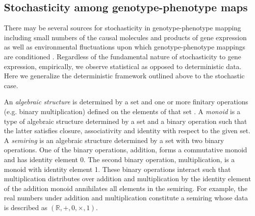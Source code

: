 \subsection{Stochasticity among genotype-phenotype maps}
There may be several sources for stochasticity in genotype-phenotype mapping including small numbers of the causal molecules and products of gene expression as well as environmental fluctuations upon which genotype-phenotype mappings are conditioned \cite{Swain2002,Paulsson2004,Thattai2004,Acar2008a,Lestas2010,Munsky2012,Chalancon2012,Neuert2013,Sanchez2013}. Regardless of the fundamental nature of stochasticity to gene expression, empirically, we observe statistical as opposed to deterministic data. Here we generalize the deterministic framework outlined above to the stochastic case.

An \emph{algebraic structure} is determined by a set and one or more finitary operations (e.g. binary multiplication) defined on the elements of that set \cite{PachterLior2005,Artin2010}. A \emph{monoid} is a type of algebraic structure determined by a set and a binary operation such that the latter satisfies closure, associativity and identity with respect to the given set. A \emph{semiring} is an algebraic structure determined by a set with two binary operations. One of the binary operations, addition, forms a commutative monoid and has identity element 0. The second binary operation, multiplication, is a monoid with identity element 1. These binary operations interact such that multiplication distributes over addition and multiplication by the identity element of the addition monoid annihilates all elements in the semiring. For example, the real numbers under addition and multiplication constitute a semiring whose data is described as $\left( \mathbb{R},+,0,\times,1 \right)$.

